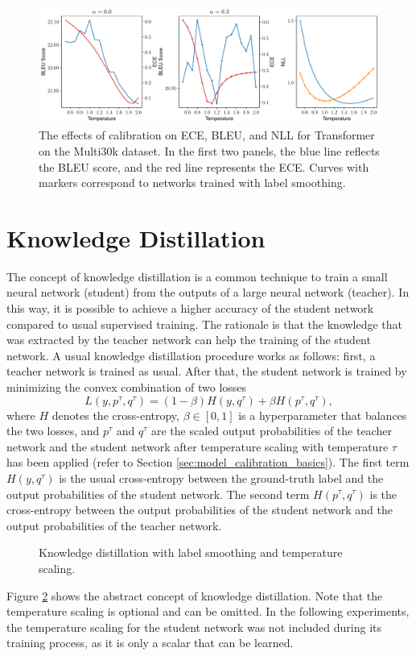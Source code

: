 \begin{figure}[ht]
    \centering
    \includegraphics[width=1\linewidth]{figures/transformer_calibrationEffects_0.3.pdf}
    \caption{The effects of calibration on ECE, BLEU, and NLL for Transformer on the Multi30k dataset. In the first two panels, the blue line reflects the BLEU score, and the red line represents the ECE. Curves with markers correspond to networks trained with label smoothing.}
    \label{fig:cal_effect_transformer}
\end{figure}

\section{Knowledge Distillation}\label{sec:kd}
The concept of knowledge distillation \citep{hinton2015} is a common technique to train a small neural network (student) from the outputs of a large neural network (teacher). In this way, it is possible to achieve a higher accuracy of the student network compared to usual supervised training. The rationale is that the knowledge that was extracted by the teacher network can help the training of the student network.  
A usual knowledge distillation procedure works as follows: first, a teacher network is trained as usual. After that, the student network is trained by minimizing the convex combination of two losses
\begin{equation}
    \label{eq:dist_loss}
    L(y, p^\tau, q^\tau)=(1-\beta) H(y,q^\tau) + \beta H(p^\tau, q^\tau),
\end{equation}
where $H$ denotes the cross-entropy, $\beta\in [0,1]$ is a hyperparameter that balances the two losses, and $p^\tau$ and $q^\tau$ are the scaled output probabilities of the teacher network and the student network after temperature scaling with temperature $\tau$ has been applied (refer to Section \ref{sec:model_calibration_basics}). The first term $H(y,q^\tau)$ is the usual cross-entropy between the ground-truth label and the output probabilities of the student network. The second term $H(p^\tau, q^\tau)$ is the cross-entropy between the output probabilities of the student network and the output probabilities of the teacher network.
\begin{figure}[ht]
    \centering
    
    \caption{Knowledge distillation with label smoothing and temperature scaling.}
    \label{fig:distillation_diagram}
\end{figure}
Figure \ref{fig:distillation_diagram} shows the abstract concept of knowledge distillation. Note that the temperature scaling is optional and can be omitted. In the following experiments, the temperature scaling for the student network was not included during its training process, as it is only a scalar that can be learned.

